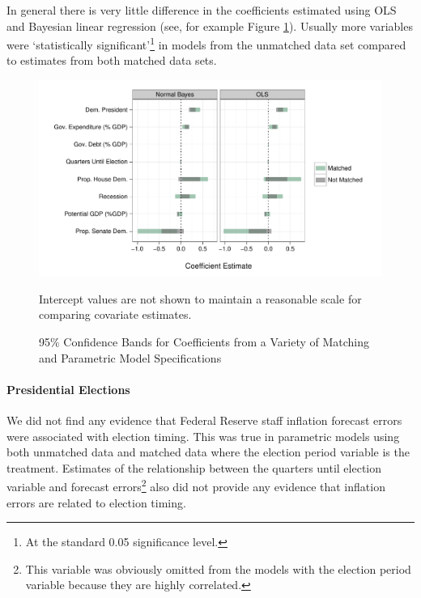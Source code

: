\documentclass[a4paper]{article}\usepackage{graphicx, color}
\newenvironment{knitrout}{}{} %
\begin{document}
In general there is very little difference in the coefficients estimated using OLS and Bayesian linear regression (see, for example Figure \ref{CoefComparePlots}). Usually more variables were `statistically significant'\footnote{At the standard 0.05 significance level.} in models from the unmatched data set compared to estimates from both matched data sets.




\begin{figure}[t]
    \caption{95\% Confidence Bands for Coefficients from a Variety of Matching and Parametric Model Specifications}
    \label{CoefComparePlots}
    \begin{center}

\begin{knitrout}
\color{fgcolor}\includegraphics[width=0.95\linewidth]{figure/CoefComparePlots} 
\end{knitrout}

    \end{center}
    \begin{singlespace}
        {\scriptsize{Intercept values are not shown to maintain a reasonable scale for comparing covariate estimates.}}
    \end{singlespace}
\end{figure}

\paragraph{Presidential Elections}

We did not find any evidence that Federal Reserve staff inflation forecast errors were associated with election timing. This was true in parametric models using both unmatched data and matched data where the election period variable is the treatment. Estimates of the relationship between the quarters until election variable and forecast errors\footnote{This variable was obviously omitted from the models with the election period variable because they are highly correlated.} also did not provide any evidence that inflation errors are related to election timing. 
\end{document}
